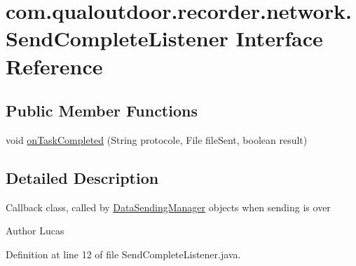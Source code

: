\hypertarget{interfacecom_1_1qualoutdoor_1_1recorder_1_1network_1_1SendCompleteListener}{\section{com.\-qualoutdoor.\-recorder.\-network.\-Send\-Complete\-Listener Interface Reference}
\label{interfacecom_1_1qualoutdoor_1_1recorder_1_1network_1_1SendCompleteListener}
}
\subsection*{Public Member Functions}
\begin{DoxyCompactItemize}
\item 
void \hyperlink{interfacecom_1_1qualoutdoor_1_1recorder_1_1network_1_1SendCompleteListener_a85686780f0a27a5246a4c2e143c618e9}{on\-Task\-Completed} (String protocole, File file\-Sent, boolean result)
\end{DoxyCompactItemize}


\subsection{Detailed Description}
Callback class, called by \hyperlink{classcom_1_1qualoutdoor_1_1recorder_1_1network_1_1DataSendingManager}{Data\-Sending\-Manager} objects when sending is over \begin{DoxyAuthor}{Author}
Lucas 
\end{DoxyAuthor}


Definition at line 12 of file Send\-Complete\-Listener.\-java.



